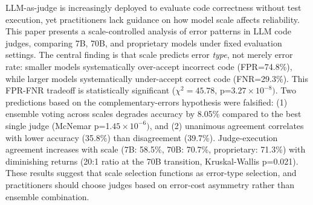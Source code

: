 
LLM-as-judge is increasingly deployed to evaluate code correctness without test execution, yet practitioners lack guidance on how model scale affects reliability. This paper presents a scale-controlled analysis of error patterns in LLM code judges, comparing 7B, 70B, and proprietary models under fixed evaluation settings. The central finding is that scale predicts error \textit{type}, not merely error rate: smaller models systematically over-accept incorrect code (FPR=74.8\%), while larger models systematically under-accept correct code (FNR=29.3\%). This FPR-FNR tradeoff is statistically significant ($\chi^{2}=45.78$, p=3.$27\times 10^{-8})$. Two predictions based on the complementary-errors hypothesis were falsified: (1) ensemble voting across scales degrades accuracy by 8.05\% compared to the best single judge (McNemar p=1.$45\times 10^{-6})$, and (2) unanimous agreement correlates with lower accuracy (35.8\%) than disagreement (39.7\%). Judge-execution agreement increases with scale (7B: 58.5\%, 70B: 70.7\%, proprietary: 71.3\%) with diminishing returns (20:1 ratio at the 70B transition, Kruskal-Wallis p=0.021). These results suggest that scale selection functions as error-type selection, and practitioners should choose judges based on error-cost asymmetry rather than ensemble combination.

